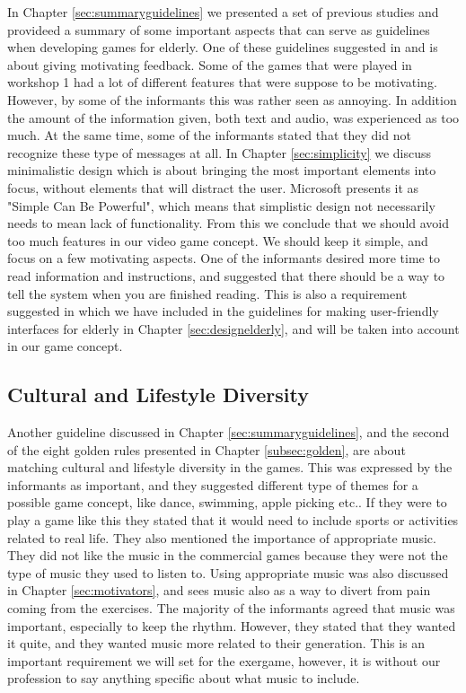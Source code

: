 In Chapter \ref{sec:summaryguidelines} we presented a set of previous studies and provideed a summary of some important aspects that can serve as guidelines when developing games for elderly. One of these guidelines suggested in \cite{Billis} and \cite{gerling1} is about giving motivating feedback. Some of the games that were played in workshop 1 had a lot of different features that were suppose to be motivating. However, by some of the informants this was rather seen as annoying.  In addition the amount of the information given, both text and audio, was experienced as too much. At the same time, some of the informants stated that they did not recognize these type of messages at all. In Chapter \ref{sec:simplicity} we discuss minimalistic design which is about bringing the most important elements into focus, without elements that will distract the user. Microsoft presents it as "Simple Can Be Powerful", which means that simplistic design not necessarily needs to mean lack of functionality. From this we conclude that we should avoid too much features in our video game concept. We should keep it simple, and focus on a few motivating aspects. One of the informants desired more time to read information and instructions, and suggested that there should be a way to tell the system when you are finished reading. This is also a requirement suggested in \cite{w3cTekst} which we have included in the guidelines for making user-friendly interfaces for elderly in Chapter \ref{sec:designelderly}, and will be taken into account in our game concept. 

\subsection{Cultural and Lifestyle Diversity}
Another guideline discussed in Chapter \ref{sec:summaryguidelines}, and the second of the eight golden rules presented in Chapter \ref{subsec:golden}, are about matching cultural and lifestyle diversity in the games. This was expressed by the informants as important, and they suggested different type of themes for a possible game concept, like dance, swimming, apple picking etc.. If they were to play a game like this they stated that it would need to include sports or activities related to real life. They also mentioned the importance of appropriate music. They did not like the music in the commercial games because they were not the type of music they used to listen to. Using appropriate music was also discussed in Chapter \ref{sec:motivators}, and \cite{schutzer} sees music also as a way to divert from pain coming from the exercises. The majority of the informants agreed that music was important, especially to keep the rhythm. However, they stated that they wanted it quite, and they wanted music more related to their generation. This is an important requirement we will set for the exergame, however, it is without our profession to say anything specific about what music to include. 

